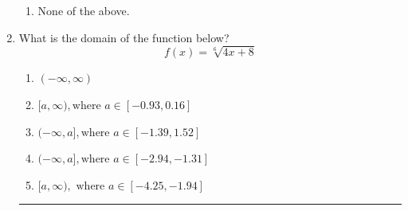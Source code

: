 \documentclass[14pt]{extbook}
\newcommand{\litem}[1]{\item#1\hspace*{-1cm}\rule{\textwidth}{0.4pt}}
\begin{document}
\begin{enumerate}
{\begin{enumerate}[label=\Alph*.]
\item None of the above.
\end{enumerate} }
\litem{
What is the domain of the function below?\[ f(x) = \sqrt[6]{4 x + 8} \]\begin{enumerate}[label=\Alph*.]
\item \( (-\infty, \infty) \)
\item \( [a, \infty), \text{where } a \in [-0.93, 0.16] \)
\item \( (-\infty, a], \text{where } a \in [-1.39, 1.52] \)
\item \( (-\infty, a], \text{where } a \in [-2.94, -1.31] \)
\item \( [a, \infty), \text{ where } a \in [-4.25, -1.94] \)


\end{enumerate}}
\end{enumerate}
\end{document}
